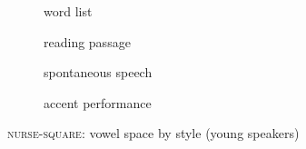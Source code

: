 \begin{figure}[h!]
	\centering
	\begin{subfigure}{.49\textwidth}
		\centering
			\resizebox{\linewidth}{!}{} 
		\caption{word list}
		\label{fig.nurse.space.young.list}
	\end{subfigure}
	\begin{subfigure}{.49\textwidth}
		\centering
			\resizebox{\linewidth}{!}{} 
		\caption{reading passage}
		\label{fig.nurse.space.young.read}
	\end{subfigure}
	
	\begin{subfigure}{.49\textwidth}
		\centering
			\resizebox{\linewidth}{!}{} 
		\caption{spontaneous speech}
		\label{fig.nurse.space.young.free}
	\end{subfigure}
	\begin{subfigure}{.49\textwidth}
		\centering
			\resizebox{\linewidth}{!}{} 
		\caption{accent performance}
		\label{fig.nurse.space.young.imit}
	\end{subfigure}
	
	\caption{\textsc{nurse}-\textsc{square}: vowel space by style (young speakers)}
	\label{fig.nurse.space.young}
\end{figure}

